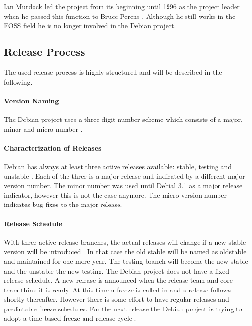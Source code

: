 Ian Murdock led the project from its beginning until 1996 as the project
leader when he passed this function to Bruce Perens
\cite{DebianFAQ,DebianHistory}. Although he still works in the \ac{FOSS} field
he is no longer involved in the Debian project.

\subsection{Release Process}

The used release process is highly structured and will be described in the
following.

\paragraph{Version Naming}

The Debian project uses a three digit number scheme which consists of a major,
minor and micro number \cite{DebianReleases}.

\paragraph{Characterization of Releases}

Debian has always at least three active releases available: stable, testing and
unstable \cite{DebianReleases,DebianReleaseManagement}. Each of the three is a
major release and indicated by a different major version number. The minor
number was used until Debial 3.1 as a major release indicator, however this is
not the case anymore. The micro version number indicates bug fixes to the major
release.

\paragraph{Release Schedule}

With three active release branches, the actual releases will change if a new
stable version will be introduced
\cite{McGovern2011,DebianReleaseManagement,DebianReleaseGoals}. In that case
the old stable will be named as oldstable and maintained for one more year. The
testing branch will become the new stable and the unstable the new testing. The
Debian project does not have a fixed release schedule. A new release is
announced when the release team and core team think it is ready. At this time a
freeze is called in and a release follows shortly thereafter. However there is
some effort to have regular releases and predictable freeze schedules. For the
next release the Debian project is trying to adopt a time based freeze and
release cycle \cite{McGovern2011}.

